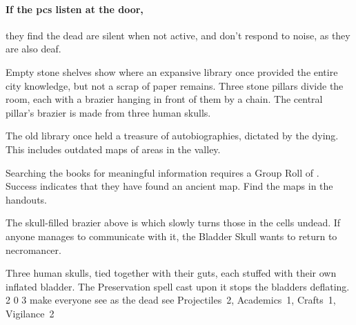 \paragraph{If the \glspl{pc} listen at the door,}
they find the dead are silent when not active, and don't respond to noise, as they are also deaf.%


\begin{boxtext}

  Empty stone shelves show where an expansive library once provided the entire city knowledge, but not a scrap of paper remains.
  Three stone pillars divide the room, each with a brazier hanging in front of them by a chain.
  The central pillar's brazier is made from three human skulls.

\end{boxtext}


\begin{exampletext}
  The old library once held a treasure of autobiographies, dictated by the dying.
  This includes outdated maps of areas in the \gls{valley}.
\end{exampletext}

\noindent
Searching the books for meaningful information requires a Group Roll of .
Success indicates that they have found an ancient map.
Find the maps in the handouts.

The skull-filled brazier above is  which slowly turns those in the cells undead.
If anyone manages to communicate with it, the Bladder Skull wants to return to \gls{necromancer}.

  {Three human skulls, tied together with their guts, each stuffed with their own inflated bladder.
  The Preservation spell cast upon it stops the bladders deflating.}%
  {2}%
  {0}%
  {3}%
  {make everyone see as the dead see}%
  {
    \setcounter{Fate}{2}
    \setcounter{Air}{2}
    \setcounter{Water}{1}
  }%
  {Projectiles~2, Academics~1, Crafts~1, Vigilance~2}%
  {
    \revelationSpell
  }%

